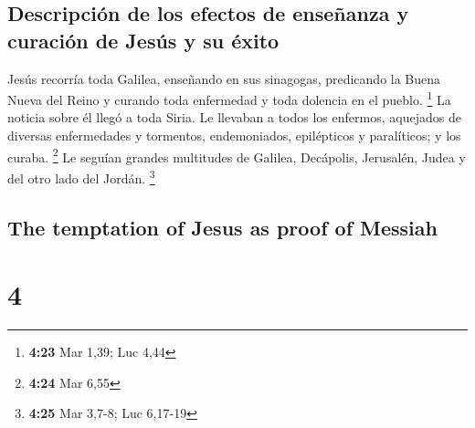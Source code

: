 \begin{paracol}{2}
\hypertarget{descripciuxf3n-de-los-efectos-de-enseuxf1anza-y-curaciuxf3n-de-jesuxfas-y-su-uxe9xito}{%
\subsection{Descripción de los efectos de enseñanza y curación de Jesús
y su
éxito}\label{descripciuxf3n-de-los-efectos-de-enseuxf1anza-y-curaciuxf3n-de-jesuxfas-y-su-uxe9xito}}

 Jesús recorría toda Galilea, enseñando en sus sinagogas,
predicando la Buena Nueva del Reino y curando toda enfermedad y toda
dolencia en el pueblo. \footnote{\textbf{4:23} Mar 1,39; Luc 4,44}
 La noticia sobre él llegó a toda Siria. Le llevaban a
todos los enfermos, aquejados de diversas enfermedades y tormentos,
endemoniados, epilépticos y paralíticos; y los curaba. \footnote{\textbf{4:24}
  Mar 6,55}  Le seguían grandes multitudes de Galilea,
Decápolis, Jerusalén, Judea y del otro lado del Jordán. \footnote{\textbf{4:25}
  Mar 3,7-8; Luc 6,17-19}

\switchcolumn
\begin{otherlanguage}{english}

\hypertarget{the-temptation-of-jesus-as-proof-of-messiah}{%
\subsection{The temptation of Jesus as proof of
Messiah}\label{the-temptation-of-jesus-as-proof-of-messiah}}

\hypertarget{section-7}{%
\section{4}\label{section-7}}


\end{otherlanguage}
\end{paracol}
